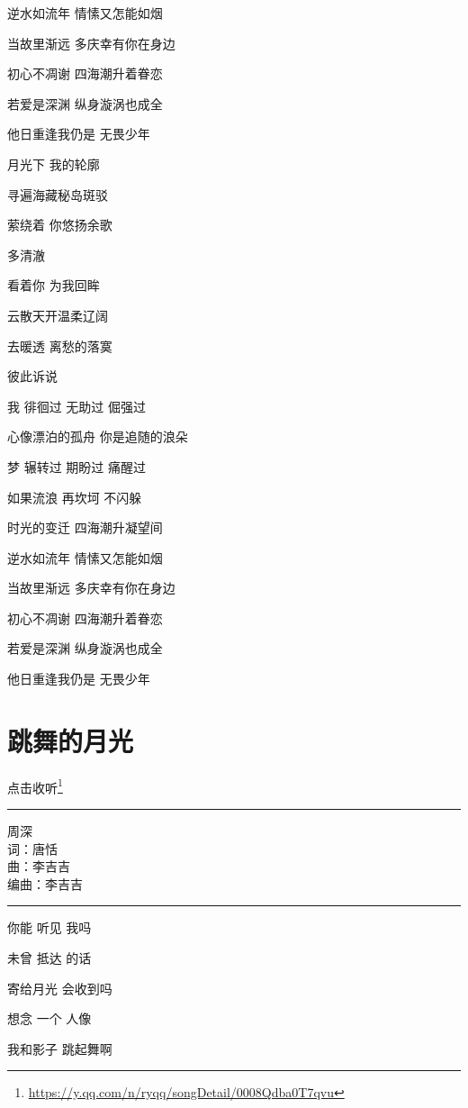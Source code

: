 \documentclass[]{ctexbook}
\renewcommand{\href}[2]{#2\footnote{\url{#1}}}
\begin{document}
逆水如流年 情愫又怎能如烟

当故里渐远 多庆幸有你在身边

初心不凋谢 四海潮升着眷恋

若爱是深渊 纵身漩涡也成全

他日重逢我仍是 无畏少年

月光下 我的轮廓

寻遍海藏秘岛斑驳

萦绕着 你悠扬余歌

多清澈

看着你 为我回眸

云散天开温柔辽阔

去暖透 离愁的落寞

彼此诉说

我 徘徊过 无助过 倔强过

心像漂泊的孤舟 你是追随的浪朵

梦 辗转过 期盼过 痛醒过

如果流浪 再坎坷 不闪躲

时光的变迁 四海潮升凝望间

逆水如流年 情愫又怎能如烟

当故里渐远 多庆幸有你在身边

初心不凋谢 四海潮升着眷恋

若爱是深渊 纵身漩涡也成全

他日重逢我仍是 无畏少年

\section*{跳舞的月光}\label{dancing-moonshine}


\href{https://y.qq.com/n/ryqq/songDetail/0008Qdba0T7qvu}{点击收听}

\begin{center}\rule{0.5\linewidth}{0.5pt}\end{center}

周深\\
词：唐恬\\
曲：李吉吉\\
编曲：李吉吉

\begin{center}\rule{0.5\linewidth}{0.5pt}\end{center}

你能 听见 我吗

未曾 抵达 的话

寄给月光 会收到吗

想念 一个 人像

我和影子 跳起舞啊
\end{document}
